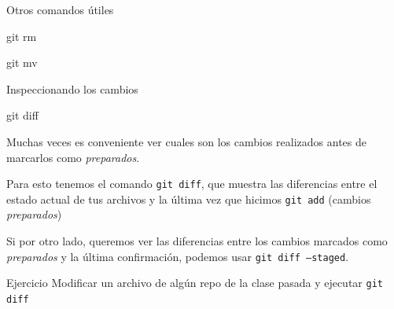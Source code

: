\begin{frame}[t]{Otros comandos útiles}
    \begin{comando}
        git rm
    \end{comando}


    \vspace{2em}

    \begin{comando}
        git mv
    \end{comando}

\end{frame}

\begin{frame}[t]{Inspeccionando los cambios}
    \begin{comando}
        git diff
    \end{comando}

    \pause
    \begin{block}{}
        Muchas veces es conveniente ver cuales son los cambios realizados antes de marcarlos como \textit{preparados}.

        Para esto tenemos el comando \texttt{git diff}, que muestra las diferencias entre
        el estado actual de tus archivos y la última vez que hicimos \texttt{git add} (cambios \textit{preparados})

        \vspace{1em}

        Si por otro lado, queremos ver las diferencias entre los cambios marcados como \textit{preparados} y la última confirmación,
        podemos usar \texttt{git diff --staged}.
    \end{block}

    \pause
    \begin{ejercicio}{Ejercicio}
        Modificar un archivo de algún repo de la clase pasada y ejecutar \texttt{git diff}
    \end{ejercicio}
\end{frame}

